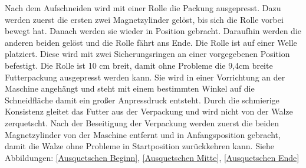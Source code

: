 Nach dem Aufschneiden wird mit einer Rolle die Packung ausgepresst. Dazu werden zuerst die ersten zwei Magnetzylinder gelöst, bis sich die Rolle vorbei bewegt hat. Danach werden sie wieder in Position gebracht. Daraufhin werden die anderen beiden gelöst und die Rolle fährt ans Ende. Die Rolle ist auf einer Welle platziert. Diese wird mit zwei Sicherungsringen an einer  vorgegebenen Position befestigt. Die Rolle ist 10 cm breit, damit ohne Probleme die 9,4cm breite Futterpackung ausgepresst werden kann. Sie wird in einer Vorrichtung an der Maschine angehängt und steht mit einem bestimmten Winkel auf die Schneidfläche damit ein großer Anpressdruck entsteht. Durch die schmierige Konsistenz gleitet das Futter aus der Verpackung und wird nicht von der Walze zerquetscht. Nach der Beseitigung der Verpackung werden zuerst die beiden Magnetzylinder von der Maschine entfernt und in Anfangsposition gebracht, damit die Walze ohne Probleme in Startposition zurückkehren kann. Siehe Abbildungen: \ref{Ausquetschen Beginn}, \ref{Ausquetschen Mitte}, \ref{Ausquetschen Ende}



